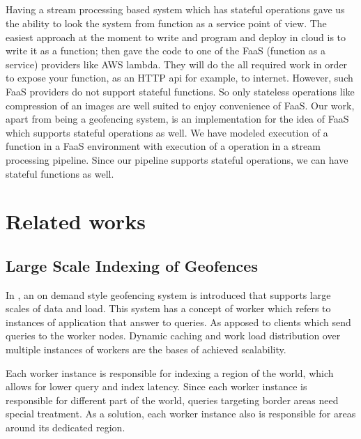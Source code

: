 \documentclass[a4]{report}
\begin{document}
    \paragraph{}
    Having a stream processing based system which has stateful operations gave us the ability to look the system from
    function as a service\cite{whatisfaas} point of view.
    The easiest approach at the moment to write and program and deploy in cloud is to write it as a function;
    then gave the code to one of the FaaS (function as a service) providers like AWS lambda\cite{lambda}.
    They will do the all required work in order to expose your function, as an HTTP api for example, to internet.
    However, such FaaS providers do not support stateful functions.
    So only stateless operations like compression of an images are well suited to enjoy convenience of FaaS.
    Our work, apart from being a geofencing system, is an implementation for the idea of FaaS which supports stateful
    operations as well.
    We have modeled execution of a function in a FaaS environment with execution of a operation in a stream
    processing pipeline.
    Since our pipeline supports stateful operations, we can have stateful functions as well.


    \chapter{Related works}


    \section{Large Scale Indexing of Geofences}
    In \cite{Cirillo-Jacobs-Martin-Szczytowski-2014}, an on demand style geofencing system is introduced that
    supports large scales of data and load.
    This system has a concept of worker which refers to instances of application that answer to queries.
    As apposed to clients which send queries to the worker nodes.
    Dynamic caching and work load distribution over multiple instances of workers are the bases of achieved
    scalability.

    Each worker instance is responsible for indexing a region of the world, which allows for lower query and index latency.
    Since each worker instance is responsible for different part of the world, queries targeting border areas need
    special treatment.
    As a solution, each worker instance also is responsible for areas around its dedicated region.
\end{document}
